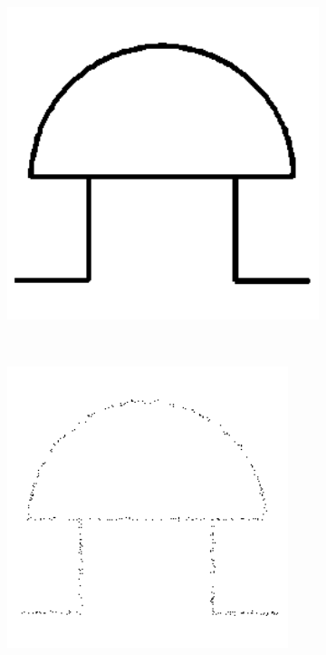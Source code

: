 \begin{figure}[h]
        \centering
                \begin{subfigure}[b]{0.2\textwidth}
                \centering
                \includegraphics[width=1.1\textwidth]{figures/Results/SetC/Model.png}
                \caption{}
        \end{subfigure}\\
                \begin{subfigure}[b]{0.25\textwidth}
                \centering
                \includegraphics[width=0.9\textwidth]{figures/Results/SetC/1.png}

\end{subfigure}
\end{figure}
